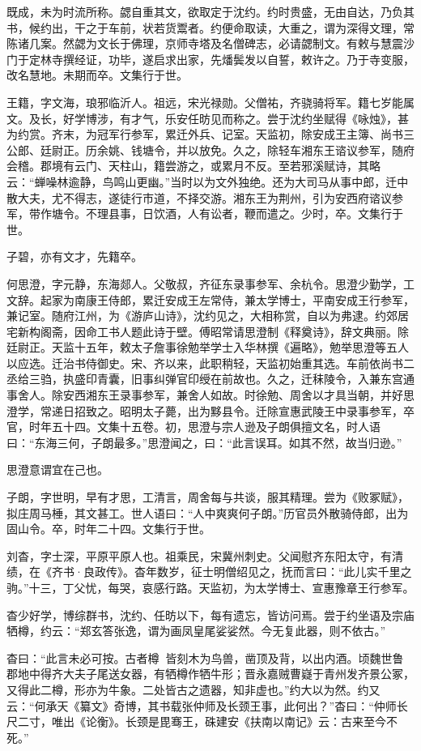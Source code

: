 \documentclass[12pt,UTF8]{ctexbook}
\begin{document}
既成，未为时流所称。勰自重其文，欲取定于沈约。约时贵盛，无由自达，乃负其书，候约出，干之于车前，状若货鬻者。约便命取读，大重之，谓为深得文理，常陈诸几案。然勰为文长于佛理，京师寺塔及名僧碑志，必请勰制文。有敕与慧震沙门于定林寺撰经证，功毕，遂启求出家，先燔鬓发以自誓，敕许之。乃于寺变服，改名慧地。未期而卒。文集行于世。

王籍，字文海，琅邪临沂人。祖远，宋光禄勋。父僧祐，齐骁骑将军。籍七岁能属文。及长，好学博涉，有才气，乐安任昉见而称之。尝于沈约坐赋得《咏烛》，甚为约赏。齐末，为冠军行参军，累迁外兵、记室。天监初，除安成王主簿、尚书三公郎、廷尉正。历余姚、钱塘令，并以放免。久之，除轻车湘东王谘议参军，随府会稽。郡境有云门、天柱山，籍尝游之，或累月不反。至若邪溪赋诗，其略云：“蝉噪林逾静，鸟鸣山更幽。”当时以为文外独绝。还为大司马从事中郎，迁中散大夫，尤不得志，遂徒行市道，不择交游。湘东王为荆州，引为安西府谘议参军，带作塘令。不理县事，日饮酒，人有讼者，鞭而遣之。少时，卒。文集行于世。

子碧，亦有文才，先籍卒。

何思澄，字元静，东海郯人。父敬叔，齐征东录事参军、余杭令。思澄少勤学，工文辞。起家为南康王侍郎，累迁安成王左常侍，兼太学博士，平南安成王行参军，兼记室。随府江州，为《游庐山诗》，沈约见之，大相称赏，自以为弗逮。约郊居宅新构阁斋，因命工书人题此诗于壁。傅昭常请思澄制《释奠诗》，辞文典丽。除廷尉正。天监十五年，敕太子詹事徐勉举学士入华林撰《遍略》，勉举思澄等五人以应选。迁治书侍御史。宋、齐以来，此职稍轻，天监初始重其选。车前依尚书二丞给三驺，执盛印青囊，旧事纠弹官印绶在前故也。久之，迁秣陵令，入兼东宫通事舍人。除安西湘东王录事参军，兼舍人如故。时徐勉、周舍以才具当朝，并好思澄学，常递日招致之。昭明太子薨，出为黟县令。迁除宣惠武陵王中录事参军，卒官，时年五十四。文集十五卷。初，思澄与宗人逊及子朗俱擅文名，时人语曰：“东海三何，子朗最多。”思澄闻之，曰：“此言误耳。如其不然，故当归逊。”

思澄意谓宜在己也。

子朗，字世明，早有才思，工清言，周舍每与共谈，服其精理。尝为《败冢赋》，拟庄周马棰，其文甚工。世人语曰：“人中爽爽何子朗。”历官员外散骑侍郎，出为固山令。卒，时年二十四。文集行于世。

刘杳，字士深，平原平原人也。祖乘民，宋冀州刺史。父闻慰齐东阳太守，有清绩，在《齐书·良政传》。杳年数岁，征士明僧绍见之，抚而言曰：“此儿实千里之驹。”十三，丁父忧，每哭，哀感行路。天监初，为太学博士、宣惠豫章王行参军。

杳少好学，博综群书，沈约、任昉以下，每有遗忘，皆访问焉。尝于约坐语及宗庙牺樽，约云：“郑玄答张逸，谓为画凤皇尾娑娑然。今无复此器，则不依古。”

杳曰：“此言未必可按。古者樽，皆刻木为鸟兽，凿顶及背，以出内酒。顷魏世鲁郡地中得齐大夫子尾送女器，有牺樽作牺牛形；晋永嘉贼曹嶷于青州发齐景公冢，又得此二樽，形亦为牛象。二处皆古之遗器，知非虚也。”约大以为然。约又云：“何承天《纂文》奇博，其书载张仲师及长颈王事，此何出？”杳曰：“仲师长尺二寸，唯出《论衡》。长颈是毘骞王，硃建安《扶南以南记》云：古来至今不死。”
\end{document}
